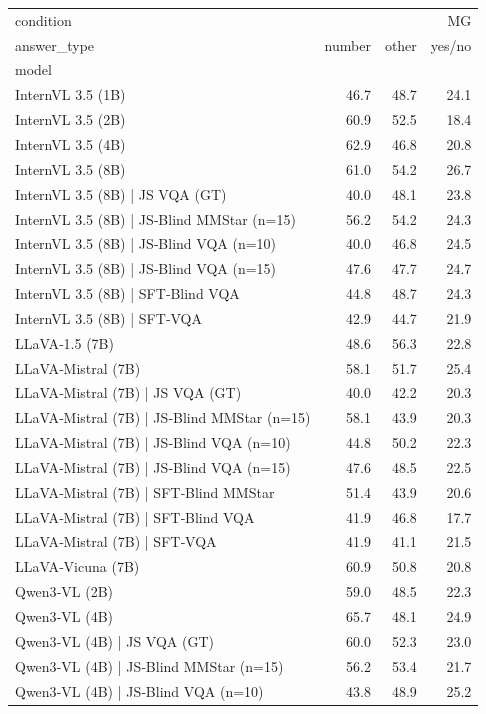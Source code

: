 \begin{tabular}{lrrr}
\toprule
condition & \multicolumn{3}{r}{MG} \\
answer_type & number & other & yes/no \\
model &  &  &  \\
\midrule
InternVL 3.5 (1B) & 46.7 & 48.7 & 24.1 \\
InternVL 3.5 (2B) & 60.9 & 52.5 & 18.4 \\
InternVL 3.5 (4B) & 62.9 & 46.8 & 20.8 \\
InternVL 3.5 (8B) & 61.0 & 54.2 & 26.7 \\
InternVL 3.5 (8B) | JS VQA (GT) & 40.0 & 48.1 & 23.8 \\
InternVL 3.5 (8B) | JS‑Blind MMStar (n=15) & 56.2 & 54.2 & 24.3 \\
InternVL 3.5 (8B) | JS‑Blind VQA (n=10) & 40.0 & 46.8 & 24.5 \\
InternVL 3.5 (8B) | JS‑Blind VQA (n=15) & 47.6 & 47.7 & 24.7 \\
InternVL 3.5 (8B) | SFT‑Blind VQA & 44.8 & 48.7 & 24.3 \\
InternVL 3.5 (8B) | SFT‑VQA & 42.9 & 44.7 & 21.9 \\
LLaVA‑1.5 (7B) & 48.6 & 56.3 & 22.8 \\
LLaVA‑Mistral (7B) & 58.1 & 51.7 & 25.4 \\
LLaVA‑Mistral (7B) | JS VQA (GT) & 40.0 & 42.2 & 20.3 \\
LLaVA‑Mistral (7B) | JS‑Blind MMStar (n=15) & 58.1 & 43.9 & 20.3 \\
LLaVA‑Mistral (7B) | JS‑Blind VQA (n=10) & 44.8 & 50.2 & 22.3 \\
LLaVA‑Mistral (7B) | JS‑Blind VQA (n=15) & 47.6 & 48.5 & 22.5 \\
LLaVA‑Mistral (7B) | SFT‑Blind MMStar & 51.4 & 43.9 & 20.6 \\
LLaVA‑Mistral (7B) | SFT‑Blind VQA & 41.9 & 46.8 & 17.7 \\
LLaVA‑Mistral (7B) | SFT‑VQA & 41.9 & 41.1 & 21.5 \\
LLaVA‑Vicuna (7B) & 60.9 & 50.8 & 20.8 \\
Qwen3‑VL (2B) & 59.0 & 48.5 & 22.3 \\
Qwen3‑VL (4B) & 65.7 & 48.1 & 24.9 \\
Qwen3‑VL (4B) | JS VQA (GT) & 60.0 & 52.3 & 23.0 \\
Qwen3‑VL (4B) | JS‑Blind MMStar (n=15) & 56.2 & 53.4 & 21.7 \\
Qwen3‑VL (4B) | JS‑Blind VQA (n=10) & 43.8 & 48.9 & 25.2 \\

\end{tabular}
